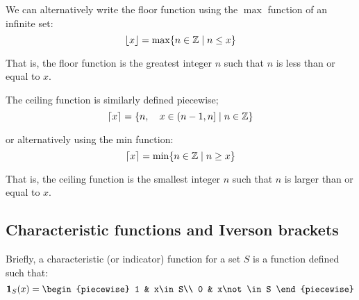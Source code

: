 We can alternatively write the floor function using the $\max$ function of an infinite set:
$$
\lfloor x\rfloor=\max\{n\in\mathbb{Z}\mid n\leq x\}
$$

That is, the floor function is the greatest integer $n$ such that $n$ is less than or equal to $x$.

The ceiling function is similarly defined piecewise;
$$
\lceil x\rceil=\{n,\quad x\in(n-1,n]\mid n\in\mathbb{Z}\}
$$

or alternatively using the min function:
$$
\lceil x\rceil=\min\{n\in\mathbb{Z}\mid n\geq x\}
$$

That is, the ceiling function is the smallest integer $n$ such that $n$ is larger than or equal to $x$.

\subsection{Characteristic functions and Iverson brackets}
Briefly, a characteristic (or indicator) function for a set $S$ is a function defined such that:
$$
    \mathbf{1}_{S}(x)=\begin{piecewise}
        1 & x\in S\\
        0 & x\not\in S
    \end{piecewise}
$$

